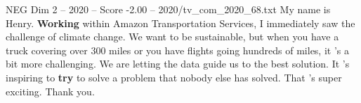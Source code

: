 \begin{textsample}{NEG Dim 2 – 2020 – Score -2.00 – 2020/tv\_com\_2020\_68.txt}  \label{ex:f2_neg_032}
My name is Henry. \textbf{Working} within Amazon Transportation Services, I immediately saw the challenge of climate change.
We want to be sustainable, but when you have a truck covering over 300 miles or you have flights going hundreds of miles, it 's a bit more challenging.
We are letting the data guide us to the best solution.
It 's inspiring to \textbf{try} to solve a problem that nobody else has solved.
That 's super exciting.
Thank you.

\end{textsample}
